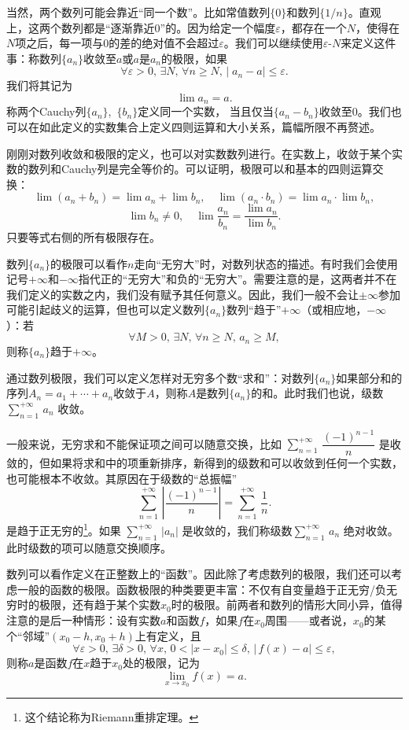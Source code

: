 当然，两个数列可能会靠近“同一个数”。比如常值数列$\{0\}$和数列$\{ 1/n\}$。直观上，这两个数列都是“逐渐靠近$0$”的。因为给定一个幅度$\varepsilon$，都存在一个$N$，使得在$N$项之后，每一项与$0$的差的绝对值不会超过$\varepsilon$。我们可以继续使用$\varepsilon\text{-}N$来定义这件事：称数列$\{a_n\}$收敛至$a$或$a$是$a_n$的极限，如果
\[\forall \varepsilon>0,\,\exists N,\,\forall n\geqslant  N,\,|\;\!a_n-a|\leqslant  \varepsilon.\]
我们将其记为
\[\lim a_n=a.\]
称两个Cauchy列$\{a_n\}$,~$\{b_n\}$定义同一个实数，
当且仅当$\{a_n-b_n\}$收敛至$0$。我们也可以在如此定义的实数集合上定义四则运算和大小关系，篇幅所限不再赘述。

刚刚对数列收敛和极限的定义，也可以对实数数列进行。在实数上，收敛于某个实数的数列和Cauchy列是完全等价的。可以证明，极限可以和基本的四则运算交换：
\[
    \lim(a_n+b_n)=\lim a_n+\lim b_n,\quad\lim(a_n\cdot b_n)=\lim a_n\cdot \lim b_n,
\]
\[\lim b_n\neq 0,\quad\lim \frac {a_n}{b_n}=\frac{\lim a_n}{\lim b_n}.\]
只要等式右侧的所有极限存在。

数列$\{a_n\}$的极限可以看作$n$走向“无穷大”时，对数列状态的描述。有时我们会使用记号$+\infty$和$-\infty$指代正的“无穷大”和负的“无穷大”。需要注意的是，这两者并不在我们定义的实数之内，我们没有赋予其任何意义。因此，我们一般不会让$\pm\infty$参加可能引起歧义的运算，但也可以定义数列$\{a_n\}$数列“趋于”$+\infty$（或相应地，$-\infty$）：若
\[\forall  M>0,\,\exists N,\,\forall n\geqslant  N,\,a_n\geqslant  M,\]
则称$\{a_n\}$趋于$+\infty$。

通过数列极限，我们可以定义怎样对无穷多个数“求和”：对数列$\{a_n\}$如果部分和的序列$A_n=a_1+\cdots +a_n$收敛于$A$，则称$A$是数列$\{a_n\}$的和。此时我们也说，级数
$\sum_{n=1}^{+\infty}\,a_n$
收敛。

一般来说，无穷求和不能保证项之间可以随意交换，比如
$\sum_{n=1}^{+\infty}\,\dfrac{(-1)^{n-1}}{n}$
是收敛的，但如果将求和中的项重新排序，新得到的级数和可以收敛到任何一个实数，也可能根本不收敛。其原因在于级数的“总振幅”
\[\sum_{n=1}^{+\infty}\,\left|\dfrac{(-1)^{n-1}}{n}\right|=\sum_{n=1}^{+\infty}\,\dfrac{1}{n}.\]
是趋于正无穷的\footnote{这个结论称为Riemann重排定理。}。如果
$\sum_{n=1}^{+\infty}\,|a_n|$
是收敛的，我们称级数$\sum_{n=1}^{+\infty}\,a_n$
绝对收敛。此时级数的项可以随意交换顺序。

数列可以看作定义在正整数上的“函数”。因此除了考虑数列的极限，我们还可以考虑一般的函数的极限。函数极限的种类要更丰富：不仅有自变量趋于正无穷/负无穷时的极限，还有趋于某个实数$x_0$时的极限。前两者和数列的情形大同小异，值得注意的是后一种情形：设有实数$a$和函数$f$，如果$f$在$x_0$周围——或者说，$x_0$的某个“邻域”$(x_0-h,x_0+h)$上有定义，且
\[\forall \varepsilon>0,\,\exists \delta>0,\,\forall x,\,0<|x-x_0|\leqslant  \delta,\,\bigl|\,f(x)-a\bigr|\leqslant  \varepsilon,\]
则称$a$是函数$f$在$x$趋于$x_0$处的极限，记为
\[\lim_{x\to x_0}f(x)=a.\]

